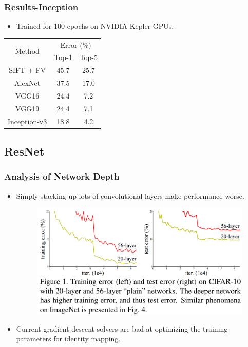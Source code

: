 \documentclass[9pt]{beamer}
\begin{document}
\begin{frame}
	\frametitle{Results-Inception}
		\begin{itemize}
			\item Trained for 100 epochs on NVIDIA Kepler GPUs.
		\end{itemize}	
		\begin{table}[]
		\centering
		\label{my-label}
		\begin{tabular}{|c|c|c|}
		\hline
		\multirow{2}{*}{Method} & \multicolumn{2}{c|}{Error (\%)} \\ \cline{2-3} 
		 & Top-1 & Top-5 \\ \hline
		SIFT + FV & 45.7 & 25.7 \\ \hline
		AlexNet & 37.5 & 17.0 \\ \hline
		VGG16 & 24.4 & 7.2 \\ \hline
		VGG19 & 24.4 & 7.1 \\ \hline
		Inception-v3 & 18.8 & 4.2 \\ \hline
		\end{tabular}
		\end{table}
\end{frame}

\subsection{ResNet}

\begin{frame}
	\frametitle{Analysis of Network Depth}
	\begin{itemize}
		\item Simply stacking up lots of convolutional layers make performance worse.	
		\begin{figure}
			\includegraphics[scale=0.15]{./figures/edit/depth_analysis.png}
		\end{figure}
		\item Current gradient-descent solvers are bad at optimizing the training parameters for identity mapping.
	\end{itemize}
\end{frame}
\end{document}

